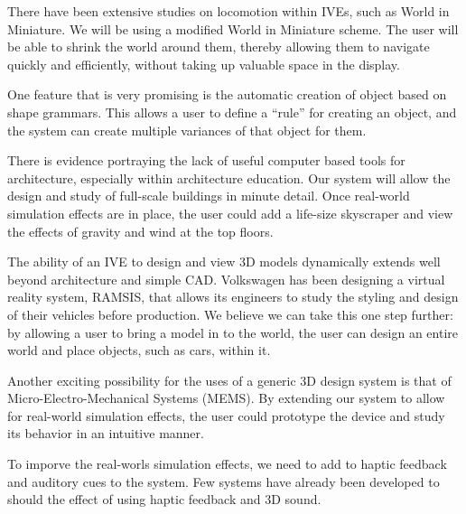 There have been extensive studies on locomotion within IVEs, such as World in Miniature\cite{Pausch:WorldInMiniature}.
We will be using a modified World in Miniature scheme.
The user will be able to shrink the world around them, thereby allowing them to navigate quickly and efficiently, without taking up valuable space in the display.

One feature that is very promising is the automatic creation of object based on shape grammars\cite{Goswell:ShapeGrammer}.
This allows a user to define a ``rule'' for creating an object, and the system can create multiple variances of that object for them.

There is evidence portraying the lack of useful computer based tools for architecture, especially within architecture education\cite{Dobson:Architecture}.
Our system will allow the design and study of full-scale buildings in minute detail.
Once real-world simulation effects are in place, the user could add a life-size skyscraper and view the effects of gravity and wind at the top floors.

The ability of an IVE to design and view 3D models dynamically extends well beyond architecture and simple CAD.
Volkswagen has been designing a virtual reality system, RAMSIS, that allows its engineers to study the styling and design of their vehicles before production\cite{Purschke:Cars}.
We believe we can take this one step further: by allowing a user to bring a model in to the world, the user can design an entire world and place objects, such as cars, within it.

Another exciting possibility for the uses of a generic 3D design system is that of Micro-Electro-Mechanical Systems (MEMS)\cite{Zhao:MEMS}.
By extending our system to allow for real-world simulation effects, the user could prototype the device and study its behavior in an intuitive manner.

To imporve the real-worls simulation effects, we need to add to haptic feedback\cite{Interactions} and auditory cues\cite{VAS} to the system. Few systems have already been developed to should the effect of using haptic feedback\cite{Vishap} and 3D sound\cite{ASR}. 


